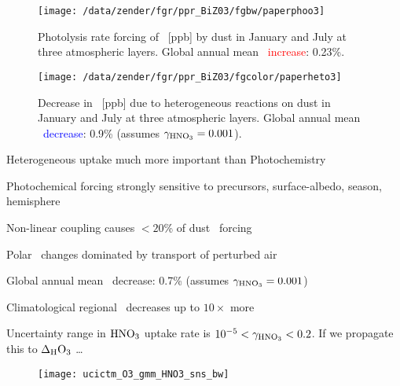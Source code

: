 \documentclass[final,dvips]{foils}
\begin{document}
\foilhead{
\Large\textcolor{blue}{\hfill Dust Forcing \Ot: Photolysis\hfill}}\vspace{-0.5in}\large
\enlargethispage*{1in} 
\begin{figure}
\centering
\texttt{[image: /data/zender/fgr/ppr\_BiZ03/fgbw/paperphoo3]}%
\caption{Photolysis rate forcing of \Ot~[ppb] by dust in January and
July at three atmospheric layers. 
Global annual mean \Ot\ \textcolor{red}{increase}: 0.23\%.
\label{fgr:phooh}}
\end{figure}

\foilhead{
\Large\textcolor{blue}{\hfill Dust Forcing \Ot: Heterogeneous\hfill}}\vspace{-0.5in}\large
\enlargethispage*{1in} 
\begin{figure}
\centering
\texttt{[image: /data/zender/fgr/ppr\_BiZ03/fgcolor/paperheto3]}%
\caption{Decrease in \Ot~[ppb] due to heterogeneous reactions on
dust in January and July at three atmospheric layers.
Global annual mean \Ot\ \textcolor{blue}{decrease}: 0.9\% (assumes $\mssuptcffHNOt = 0.001$).
\label{fgr:heto3}}
\end{figure}

\rotatefoilhead{\bgl
\Large\textcolor{blue}{\hfill Results~I: Hetero.\ vs.\ Photo.\ \hfill}}\vspace{-0.75in}\large
\begin{enumerate*}
\item Heterogeneous uptake much more important than Photochemistry
\item Photochemical forcing strongly sensitive to precursors,
  surface-albedo, season, hemisphere
\item Non-linear coupling causes $< 20$\% of dust \Ot\ forcing
\item Polar \Ot\ changes dominated by transport of perturbed air
\item Global annual mean \Ot\ decrease: 0.7\% (assumes $\mssuptcffHNOt = 0.001$)
\item Climatological regional \Ot\ decreases up to $10\times$ more
\end{enumerate*}
Uncertainty range in $\HNOt$ uptake rate is $10^{-5} < \mssuptcffHNOt < 0.2$.
If we propagate this to $\dlthchOt$ \ldots

\foilhead{}
\enlargethispage*{1in} 
\begin{figure}
\centering
\texttt{[image: ucictm\_O3\_gmm\_HNO3\_sns\_bw]}\vfill
\end{figure}
\end{document}

